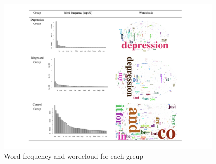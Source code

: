 \documentclass[]{article}
\begin{document}
\begin{figure}
\centering
\includegraphics{wordclouds.png}
\caption{Word frequency and wordcloud for each group}
\end{figure}
\end{document}
